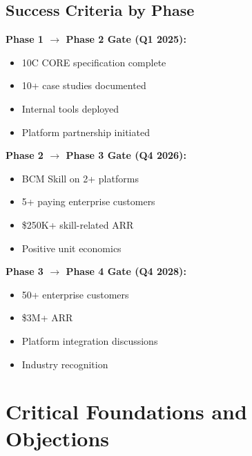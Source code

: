 \subsection{Success Criteria by Phase}

\begin{tcolorbox}[colback=yellow!5!white, colframe=yellow!75!black,
    title=Phase Gate Criteria]

\textbf{Phase 1 $\to$ Phase 2 Gate (Q1 2025):}
\begin{itemize}[nosep]
\item[$\square$] 10C CORE specification complete
\item[$\square$] 10+ case studies documented
\item[$\square$] Internal tools deployed
\item[$\square$] Platform partnership initiated
\end{itemize}

\textbf{Phase 2 $\to$ Phase 3 Gate (Q4 2026):}
\begin{itemize}[nosep]
\item[$\square$] BCM Skill on 2+ platforms
\item[$\square$] 5+ paying enterprise customers
\item[$\square$] \$250K+ skill-related ARR
\item[$\square$] Positive unit economics
\end{itemize}

\textbf{Phase 3 $\to$ Phase 4 Gate (Q4 2028):}
\begin{itemize}[nosep]
\item[$\square$] 50+ enterprise customers
\item[$\square$] \$3M+ ARR
\item[$\square$] Platform integration discussions
\item[$\square$] Industry recognition
\end{itemize}

\end{tcolorbox}



\section{Critical Foundations and Objections}
\label{sec:vvv5-foundations}

